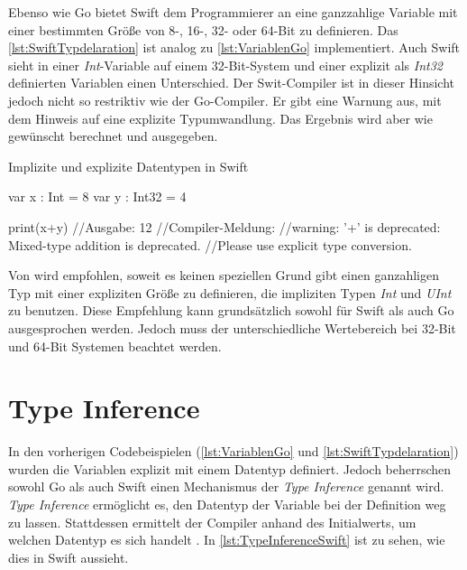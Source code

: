 Ebenso wie Go bietet Swift dem Programmierer an eine ganzzahlige Variable mit einer bestimmten Größe von 8-, 16-, 32- oder 64-Bit zu definieren.
Das \autoref{lst:SwiftTypdelaration} ist analog zu \autoref{lst:VariablenGo} implementiert.
Auch Swift sieht in einer \emph{Int}-Variable auf einem 32-Bit-System und einer explizit als \emph{Int32} definierten Variablen einen Unterschied.
Der Swit-Compiler ist in dieser Hinsicht jedoch nicht so restriktiv wie der Go-Compiler.
Er gibt eine Warnung aus, mit dem Hinweis auf eine explizite Typumwandlung.
Das Ergebnis wird aber wie gewünscht berechnet und ausgegeben. 

\begin{listing}[H]
\caption{Implizite und explizite Datentypen in Swift}
\label{lst:SwiftTypdelaration}
\begin{SwiftCode}
var x : Int = 8
var y : Int32 = 4

print(x+y) //Ausgabe: 12
//Compiler-Meldung: 
//warning: '+' is deprecated: Mixed-type addition is deprecated. 
//Please use explicit type conversion.
\end{SwiftCode}
\end{listing}

Von \cite[S.30]{Hoffman.2017} wird empfohlen, soweit es keinen speziellen Grund gibt einen ganzahligen Typ mit einer expliziten Größe zu definieren, die impliziten Typen \emph{Int} und \emph{UInt} zu benutzen.
Diese Empfehlung kann grundsätzlich sowohl für Swift als auch Go ausgesprochen werden.
Jedoch muss der unterschiedliche Wertebereich bei 32-Bit und 64-Bit Systemen beachtet werden. 

\section{Type Inference}
\label{sec:TypeInference}
In den vorherigen Codebeispielen (\ref{lst:VariablenGo} und \ref{lst:SwiftTypdelaration}) wurden die Variablen explizit mit einem Datentyp definiert. Jedoch beherrschen sowohl Go als auch Swift einen Mechanismus der \emph{Type Inference} genannt wird. 
\emph{Type Inference} ermöglicht es, den Datentyp der Variable bei der Definition weg zu lassen. 
Stattdessen ermittelt der Compiler anhand des Initialwerts, um welchen Datentyp es sich handelt \cite[S.28]{Hoffman.2017}.
In \autoref{lst:TypeInferenceSwift} ist zu sehen, wie dies in Swift aussieht.

